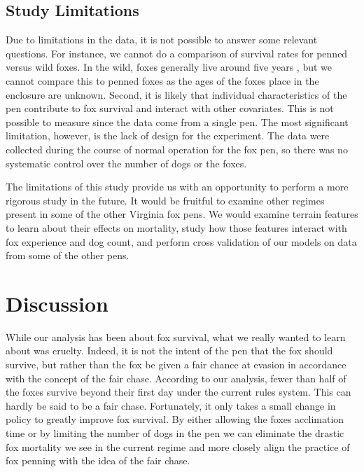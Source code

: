 \documentclass[aoas,preprint]{imsart}
\numberwithin{equation}{section}
\theoremstyle{plain}
\begin{document}
\subsection{Study Limitations}
Due to limitations in the data, it is not possible to answer some relevant questions. For instance, we cannot do a comparison of survival rates for penned versus wild foxes. In the wild, foxes generally live around five years \citep{hunter}, but we cannot compare this to penned foxes as the ages of the foxes place in the enclosure are unknown. Second, it is likely that individual characteristics of the pen contribute to fox survival and interact with other covariates. This is not possible to measure since the data come from a single pen. The most significant limitation, however, is the lack of design for the experiment. The data were collected during the course of normal operation for the fox pen, so there was no systematic control over the number of dogs or the foxes.

The limitations of this study provide us with an opportunity to perform a more rigorous study in the future. It would be fruitful to examine other regimes present in some of the other Virginia fox pens. We would examine terrain features to learn about their effects on mortality, study how those features interact with fox experience and dog count, and perform cross validation of our models on data from some of the other pens.

\section{Discussion}
While our analysis has been about fox survival, what we really wanted to learn about was cruelty. Indeed, it is not the intent of the pen that the fox should survive, but rather than the fox be given a fair chance at evasion in accordance with the concept of the fair chase. According to our analysis, fewer than half of the foxes survive beyond their first day under the current rules system. This can hardly be said to be a fair chase. Fortunately, it only takes a small change in policy to greatly improve fox survival. By either allowing the foxes acclimation time or by limiting the number of dogs in the pen we can eliminate the drastic fox mortality we see in the current regime and more closely align the practice of fox penning with the idea of the fair chase.












%
%
%
\end{document}
